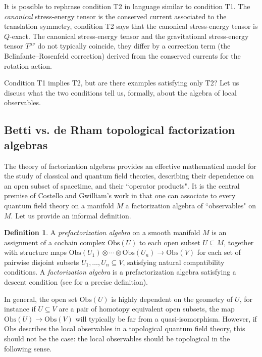 \documentclass[11pt, oneside, reqno]{amsart}
\theoremstyle{definition} \newtheorem{definition}{Definition}[section]
\theoremstyle{definition}
\theoremstyle{remark}
\theoremstyle{definition} \newtheorem{remark}[definition]{Remark}
\theoremstyle{definition} \newtheorem{remarks}[definition]{Remarks}
\theoremstyle{definition} \newtheorem{question}[definition]{Question}
\theoremstyle{definition} \newtheorem*{note}{Note}
\theoremstyle{definition} \newtheorem{example}[definition]{Example}
\theoremstyle{definition} \newtheorem{examples}[definition]{Examples}
\newcommand{\sub}{\subseteq}
\newcommand{\obs}{\mathrm{Obs}}
\begin{document}
It is possible to rephrase condition T2 in language similar to condition T1.  The \emph{canonical} stress-energy tensor is the conserved current associated to the translation symmetry, condition T2 says that the canonical stress-energy tensor is $Q$-exact.  The canonical stress-energy tensor and the gravitational stress-energy tensor $T^{\mu\nu}$ do not typically coincide, they differ by a correction term (the Belinfante--Rosenfeld correction) derived from the conserved currents for the rotation action.

Condition T1 implies T2, but are there examples satisfying only T2?  Let us discuss what the two conditions tell us, formally, about the algebra of local observables.

\subsection{Betti vs. de Rham topological factorization algebras}
The theory of factorization algebras provides an effective mathematical model for the study of classical and quantum field theories, describing their dependence on an open subset of spacetime, and their ``operator products".  
It is the central premise of Costello and Gwilliam's work in \cite{Book1,Book2} that one can associate to every quantum field theory on a manifold $M$ a factorization algebra of ``observables" on $M$. 
Let us provide an informal definition.

\begin{definition} \label{dfn:fact}
A \emph{prefactorization algebra} on a smooth manifold $M$ is an assignment of a cochain complex $\obs(U)$ to each open subset $U \sub M$, together with structure maps $\obs(U_1) \otimes \cdots \otimes \obs(U_n) \to \obs(V)$ for each set of pairwise disjoint subsets $U_1, \ldots, U_n \sub V$, satisfying natural compatibility conditions.  A \emph{factorization algebra} is a prefactorization algebra satisfying a descent condition (see \cite[Chapter 6]{Book1} for a precise definition).
\end{definition}

In general, the open set $\obs(U)$ is highly dependent on the geometry of $U$, for instance if $U \sub V$ are a pair of homotopy equivalent open subsets, the map $\obs(U) \to \obs(V)$ will typically be far from a quasi-isomorphism.  However, if $\obs$ describes the local observables in a topological quantum field theory, this should not be the case: the local observables should be topological in the following sense.
\end{document}
